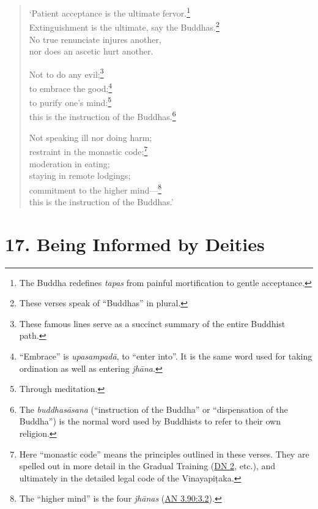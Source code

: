 \documentclass[12pt,openany]{book}%
\begin{document}
\begin{verse}%
‘Patient acceptance is the ultimate fervor.\footnote{The Buddha redefines \textit{tapas} from painful mortification to gentle acceptance. } \\
Extinguishment is the ultimate, say the Buddhas.\footnote{These verses speak of “Buddhas” in plural. } \\
No true renunciate injures another, \\
nor does an ascetic hurt another. 

Not to do any evil;\footnote{These famous lines serve as a succinct summary of the entire Buddhist path. } \\
to embrace the good;\footnote{“Embrace” is \textit{\textsanskrit{upasampadā}}, to “enter into”. It is the same word used for taking ordination as well as entering \textit{\textsanskrit{jhāna}}. } \\
to purify one’s mind:\footnote{Through meditation. } \\
this is the instruction of the Buddhas.\footnote{The \textit{\textsanskrit{buddhasāsana}} (“instruction of the Buddha” or “dispensation of the Buddha”) is the normal word used by Buddhists to refer to their own religion. } 

Not speaking ill nor doing harm; \\
restraint in the monastic code;\footnote{Here “monastic code” means the principles outlined in these verses. They are spelled out in more detail in the Gradual Training (\href{https://suttacentral.net/dn2/en/sujato}{DN 2}, etc.), and ultimately in the detailed legal code of the \textsanskrit{Vinayapiṭaka}. } \\
moderation in eating; \\
staying in remote lodgings; \\
commitment to the higher mind—\footnote{The “higher mind” is the four \textit{\textsanskrit{jhānas}} (\href{https://suttacentral.net/an3.90/en/sujato\#3.2}{AN 3.90:3.2}). } \\
this is the instruction of the Buddhas.’ 

%
\end{verse}

\section*{17. Being Informed by Deities }
\end{document}
